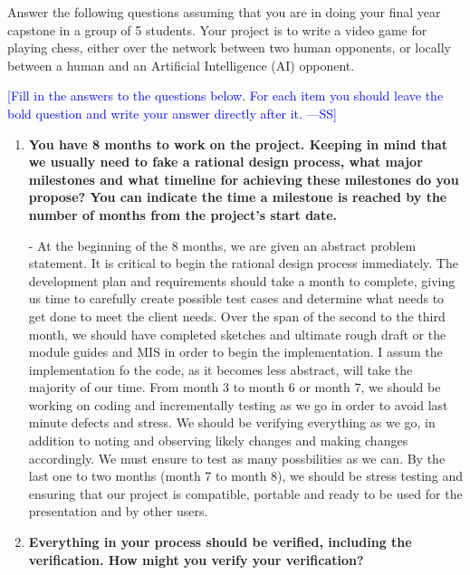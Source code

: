 \documentclass[12pt,fleqn]{examtst}
\newcommand{\authornote}[3]{\textcolor{#1}{[#3 ---#2]}}
\newcommand{\authornote}[3]{}
\newcommand{\wss}[1]{\authornote{blue}{SS}{#1}}
\begin{document}

\newpage

 Answer the following questions assuming that you are in doing
your final year capstone in a group of 5 students.  Your project is to write a
video game for playing chess, either over the network between two human
opponents, or locally between a human and an Artificial Intelligence (AI)
opponent.

\bigskip

\noindent \wss{Fill in the answers to the questions below.  For each item you
  should leave the bold question and write your answer directly after it.}

\begin{enumerate}
  
\item \textbf{You have 8 months to work on the project.  Keeping in mind that we
  usually need to fake a rational design process, what major milestones and what
  timeline for achieving these milestones do you propose?  You can indicate the
  time a milestone is reached by the number of months from the project's start date.}

  - At the beginning of the 8 months, we are given an abstract problem statement. It is critical to begin the rational design process immediately. The development plan and requirements should take a month to complete, giving us time to carefully create possible test cases and determine what needs to get done to meet the client needs. Over the span of the second to the third month, we should have completed sketches and ultimate rough draft or the module guides and MIS in order to begin the implementation. I assum the implementation fo the code, as it becomes less abstract, will take the majority of our time. From month 3 to month 6 or month 7, we should be working on coding and incrementally testing as we go in order to avoid last minute defects and stress. We should be verifying everything as we go, in addition to noting and observing likely changes and making changes accordingly. We must ensure to test as many possbilities as we can. By the last one to two months (month 7 to month 8), we should be stress testing and ensuring that our project is compatible, portable and ready to be used for the presentation and by other users.   
  
\item \textbf{Everything in your process should be verified, including the
    verification.  How might you verify your verification?}


\end{enumerate}
\end{document}
